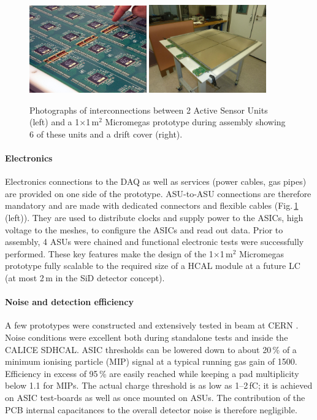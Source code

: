 \begin{figure}
\begin{centering}
\includegraphics[width=0.45\textwidth]{Calorimeter/SDHCAL/intercon}
\includegraphics[width=0.45\textwidth]{Calorimeter/SDHCAL/m2_assembly}
\caption{Photographs of interconnections between 2 Active Sensor Units (left) and a 1$\times$1\,m$^{2}$ Micromegas prototype during assembly showing 6 of these units and a drift cover (right).}
\label{mecha_elec}
\end{centering}
\end{figure}


\paragraph{Electronics}
Electronics connections to the DAQ as well as services (power cables, gas pipes) are provided on one side of the prototype. ASU-to-ASU connections are therefore mandatory and are made with dedicated connectors and flexible cables (Fig.\,\ref{mecha_elec} (left)). They are used to distribute clocks and supply power to the ASICs, high voltage to the meshes, to configure the ASICs and read out data. Prior to assembly, 4 ASUs were chained and functional electronic tests were successfully performed. These key features make the design of the 1$\times$1\,m$^{2}$ Micromegas prototype fully scalable to the required size of a HCAL module at a future LC (at most 2\,m in the SiD detector concept). 

\paragraph{Noise and detection efficiency}
A few prototypes were constructed \cite{CHE13} and extensively tested in beam at CERN \cite{CHE14}. Noise conditions were excellent both during standalone tests and inside the CALICE SDHCAL. ASIC thresholds can be lowered down to about 20\,\% of a minimum ionising particle (MIP) signal at a typical running gas gain of 1500. Efficiency in excess of 95\,\% are easily reached while keeping a pad multiplicity below 1.1 for MIPs. The actual charge threshold is as low as 1--2\,fC; it is achieved on ASIC test-boards as well as once mounted on ASUs. The contribution of the PCB internal capacitances to the overall detector noise is therefore negligible.

